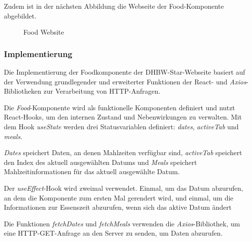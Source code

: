 Zudem ist in der nächsten Abbildung die Webseite der Food-Komponente abgebildet.
\begin{figure}[htbp]
	\centering
	\caption{Food Website}
\end{figure}
\subsubsection{Implementierung}
Die Implementierung der Foodkomponente der DHBW-Star-Webseite basiert auf der Verwendung grundlegender und erweiterter Funktionen der React- und \emph{Axios}-Bibliotheken zur Verarbeitung von HTTP-Anfragen.

Die \emph{Food}-Komponente wird als funktionelle Komponenten definiert und nutzt React-Hooks, um den internen Zustand und Nebenwirkungen zu verwalten. Mit dem Hook \emph{useState} werden drei Statusvariablen definiert: \emph{dates}, \emph{activeTab} und \emph{meals}.

\emph{Dates} speichert Daten, an denen Mahlzeiten verfügbar sind, \emph{activeTab} speichert den Index des aktuell ausgewählten Datums und \emph{Meals} speichert Mahlzeitinformationen für das aktuell ausgewählte Datum.

Der \emph{useEffect}-Hook wird zweimal verwendet. Einmal, um das Datum abzurufen, an dem die Komponente zum ersten Mal gerendert wird, und einmal, um die Informationen zur Essenszeit abzurufen, wenn sich das aktive Datum ändert

Die Funktionen \emph{fetchDates} und \emph{fetchMeals} verwenden die \emph{Axios}-Bibliothek, um eine HTTP-GET-Anfrage an den Server zu senden, um Daten abzurufen.
 
